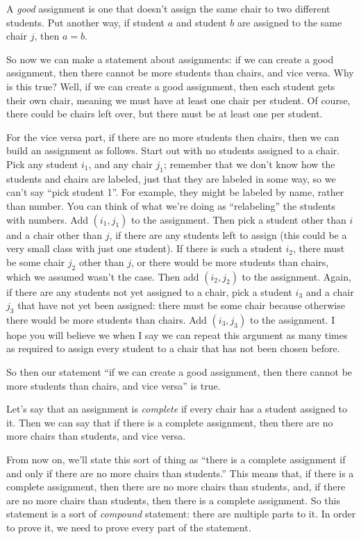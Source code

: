 \documentclass[10pt]{article}
\begin{document}
A \emph{good} assignment is one that doesn't assign the same chair to two different students.
Put another way, if student $a$ and student $b$ are assigned to the same chair $j$, then $a = b$. 

So now we can make a statement about assignments: if we can create a good assignment, then there cannot be more students than chairs, and vice versa.
Why is this true?
Well, if we can create a good assignment, then each student gets their own chair, meaning we must have at least one chair per student.
Of course, there could be chairs left over, but there must be at least one per student.

For the vice versa part, if there are no more students then chairs, then we can build an assignment as follows.
Start out with no students assigned to a chair.
Pick any student $i_1$, and any chair $j_1$; remember that we don't know how the students and chairs are labeled, just that they are labeled in some way, so we can't say ``pick student 1''.
For example, they might be labeled by name, rather than number.
You can think of what we're doing as ``relabeling'' the students with numbers.
Add $(i_1,j_1)$ to the assignment.
Then pick a student other than $i$ and a chair other than $j$, if there are any students left to assign (this could be a very small class with just one student).
If there is such a student $i_2$, there must be some chair $j_2$ other than $j$, or there would be more students than chairs, which we assumed wasn't the case.
Then add $(i_2, j_2)$ to the assignment.
Again, if there are any students not yet assigned to a chair, pick a student $i_3$ and a chair $j_3$ that have not yet been assigned: there must be some chair because otherwise there would be more students than chairs.
Add $(i_3, j_3)$ to the assignment.
I hope you will believe we when I say we can repeat this argument as many times as required to assign every student to a chair that has not been chosen before.

So then our statement ``if we can create a good assignment, then there cannot be more students than chairs, and vice versa'' is true.

Let's say that an assignment is \emph{complete} if every chair has a student assigned to it.
Then we can say that if there is a complete assignment, then there are no more chairs than students, and vice versa.

From now on, we'll state this sort of thing as ``there is a complete assignment if and only if there are no more chairs than students.''
This means that, if there is a complete assignment, then there are no more chairs than students, and, if there are no more chairs than students, then there is a complete assignment.
So this statement is a sort of \emph{compound} statement: there are multiple parts to it.
In order to prove it, we need to prove every part of the statement.
\end{document}
